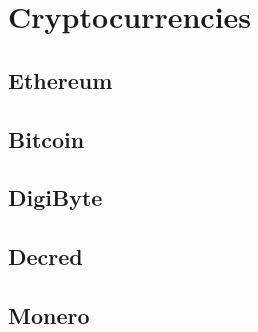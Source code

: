 \chapter{Cryptocurrencies}

\section{Ethereum}


\section{Bitcoin}


\section{DigiByte}


\section{Decred}


\section{Monero}

